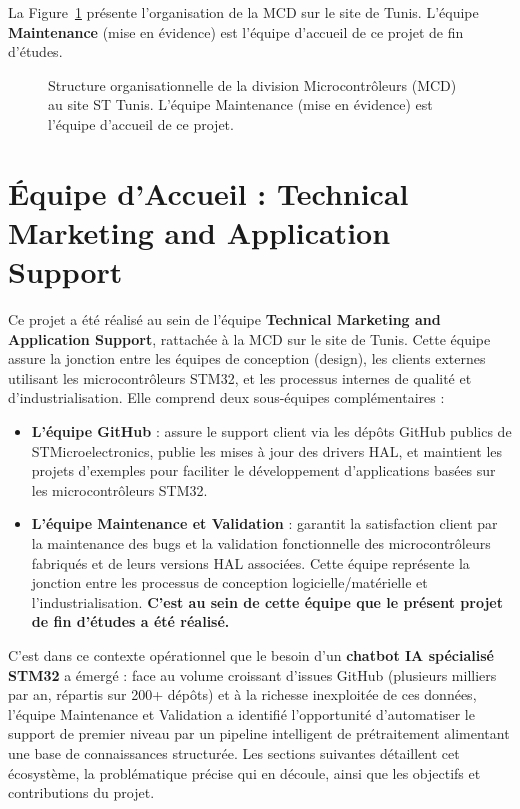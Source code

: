 \documentclass[12pt,a4paper]{report}
\begin{document}
La Figure~\ref{fig:st-site-org} présente l'organisation de la MCD sur le site de Tunis. L'équipe \textbf{Maintenance} (mise en évidence) est l'équipe d'accueil de ce projet de fin d'études.

\begin{figure}[H]
\centering
{}
\caption{Structure organisationnelle de la division Microcontrôleurs (MCD) au site ST Tunis. L'équipe Maintenance (mise en évidence) est l'équipe d'accueil de ce projet.}
\label{fig:st-site-org}
\end{figure}

\section{Équipe d'Accueil : Technical Marketing and Application Support}
\label{sec:equipe_accueil}

Ce projet a été réalisé au sein de l'équipe \textbf{Technical Marketing and Application Support}, rattachée à la MCD sur le site de Tunis. Cette équipe assure la jonction entre les équipes de conception (design), les clients externes utilisant les microcontrôleurs STM32, et les processus internes de qualité et d'industrialisation. Elle comprend deux sous-équipes complémentaires :

\begin{itemize}
  \item \textbf{L'équipe GitHub} : assure le support client via les dépôts GitHub publics de STMicroelectronics, publie les mises à jour des drivers HAL, et maintient les projets d'exemples pour faciliter le développement d'applications basées sur les microcontrôleurs STM32.

  \item \textbf{L'équipe Maintenance et Validation} : garantit la satisfaction client par la maintenance des bugs et la validation fonctionnelle des microcontrôleurs fabriqués et de leurs versions HAL associées. Cette équipe représente la jonction entre les processus de conception logicielle/matérielle et l'industrialisation. \textbf{C'est au sein de cette équipe que le présent projet de fin d'études a été réalisé.}
\end{itemize}

C'est dans ce contexte opérationnel que le besoin d'un \textbf{chatbot IA spécialisé STM32} a émergé : face au volume croissant d'issues GitHub (plusieurs milliers par an, répartis sur 200+ dépôts) et à la richesse inexploitée de ces données, l'équipe Maintenance et Validation a identifié l'opportunité d'automatiser le support de premier niveau par un pipeline intelligent de prétraitement alimentant une base de connaissances structurée. Les sections suivantes détaillent cet écosystème, la problématique précise qui en découle, ainsi que les objectifs et contributions du projet.
\end{document}
